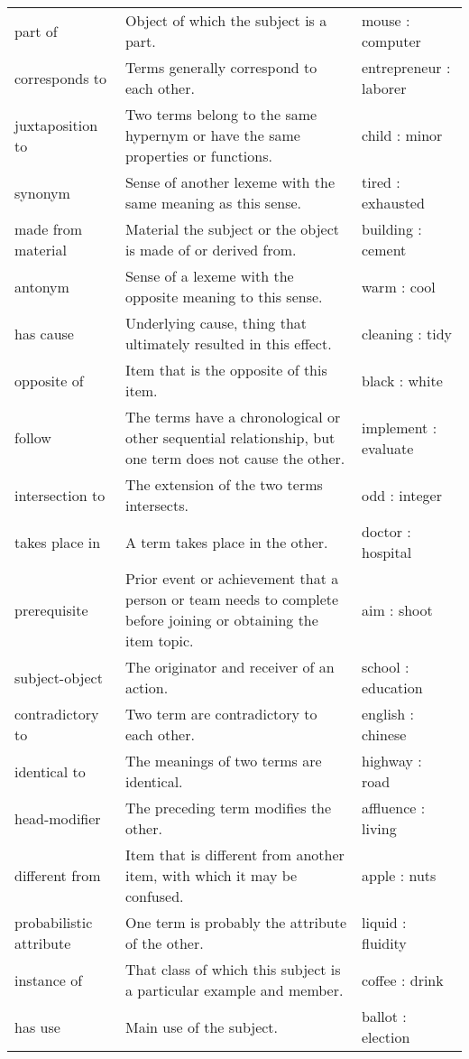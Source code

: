 \documentclass{article} \usepackage{iclr2023_conference,times}
\begin{document}
\begin{table*}[!htp]
{\begin{tabular}{lp{9.0cm}l}
part of & Object of which the subject is a part.  & mouse : computer \\
corresponds to & Terms generally correspond to each other. & entrepreneur : laborer \\
juxtaposition to & Two terms belong to the same hypernym or have the same properties or functions. & child : minor \\
synonym  & Sense of another lexeme with the same meaning as this sense. & tired : exhausted \\
made from material & Material the subject or the object is made of or derived from. & building : cement \\
antonym & Sense of a lexeme with the opposite meaning to this sense. & warm : cool \\
has cause & Underlying cause, thing that ultimately resulted in this effect. & cleaning : tidy \\
opposite of & Item that is the opposite of this item. & black : white \\
follow & The terms have a chronological or other sequential relationship, but one term does not cause the other. & implement : evaluate \\
intersection to & The extension of the two terms intersects. & odd : integer \\
takes place in & A term takes place in the other. & doctor : hospital \\
prerequisite & Prior event or achievement that a person or team needs to complete before joining or obtaining the item topic. & aim : shoot \\
subject-object & The originator and receiver of an action.  & school : education \\
contradictory to & Two term are contradictory to each other. & english : chinese \\
identical to & The meanings of two terms are identical. & highway : road \\
head-modifier & The preceding term modifies the other.  & affluence : living \\
different from & Item that is different from another item, with which it may be confused. & apple : nuts \\
probabilistic attribute & One term is probably the attribute of the other.  & liquid : fluidity \\
instance of & That class of which this subject is a particular example and member. & coffee : drink \\
has use & Main use of the subject.  & ballot : election \\

\end{tabular}}
\end{table*}
\end{document}
